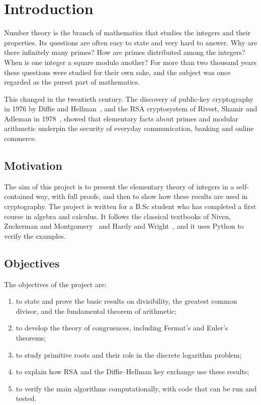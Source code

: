 \chapter{Introduction}\label{ch:intro}

Number theory is the branch of mathematics that studies the integers and their properties. Its questions are often easy to state and very hard to answer. Why are there infinitely many primes? How are primes distributed among the integers? When is one integer a square modulo another? For more than two thousand years these questions were studied for their own sake, and the subject was once regarded as the purest part of mathematics.

This changed in the twentieth century. The discovery of public-key cryptography in 1976 by Diffie and Hellman~\cite{diffie1976}, and the RSA cryptosystem of Rivest, Shamir and Adleman in 1978~\cite{rsa1978}, showed that elementary facts about primes and modular arithmetic underpin the security of everyday communication, banking and online commerce.

\section{Motivation}

The aim of this project is to present the elementary theory of integers in a self-contained way, with full proofs, and then to show how these results are used in cryptography. The project is written for a B.Sc student who has completed a first course in algebra and calculus. It follows the classical textbooks of Niven, Zuckerman and Montgomery~\cite{niven1991} and Hardy and Wright~\cite{hardy2008}, and it uses Python to verify the examples.

\section{Objectives}

The objectives of the project are:
\begin{enumerate}
  \item to state and prove the basic results on divisibility, the greatest common divisor, and the fundamental theorem of arithmetic;
  \item to develop the theory of congruences, including Fermat's and Euler's theorems;
  \item to study primitive roots and their role in the discrete logarithm problem;
  \item to explain how RSA and the Diffie--Hellman key exchange use these results;
  \item to verify the main algorithms computationally, with code that can be run and tested.
\end{enumerate}


